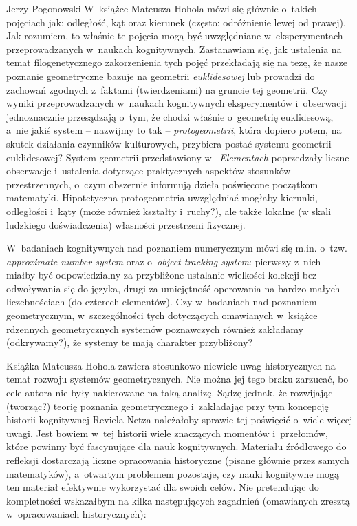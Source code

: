 \begin{newrevplenv}{Jerzy Pogonowski}
W~książce Mateusza Hohola mówi się głównie o~takich pojęciach jak:
odległość, kąt oraz kierunek (często: odróżnienie lewej od
prawej). Jak rozumiem, to właśnie te pojęcia mogą być uwzględniane
w~eksperymentach przeprowadzanych w~naukach kognitywnych.
Zastanawiam się, jak ustalenia na temat filogenetycznego
zakorzenienia tych pojęć przekładają się na tezę, że nasze
poznanie geometryczne bazuje na geometrii {\em euklidesowej} lub
prowadzi do zachowań zgodnych z~faktami (twierdzeniami) na gruncie
tej geometrii. Czy wyniki przeprowadzanych w~naukach kognitywnych
eksperymentów i~obserwacji jednoznacznie przesądzają o~tym, że
chodzi właśnie o~geometrię euklidesową, a~nie jakiś system --
nazwijmy to tak -- {\em protogeometrii}, która dopiero potem, na
skutek działania czynników kulturowych, przybiera postać systemu
geometrii euklidesowej? System geometrii przedstawiony w~{\em
Elementach} poprzedzały liczne obserwacje i~ustalenia dotyczące
praktycznych aspektów stosunków przestrzennych, o~czym obszernie
informują dzieła poświęcone początkom matematyki. Hipotetyczna
protogeometria uwzględniać mogłaby kierunki, odległości i~kąty
(może również kształty i~ruchy?), ale także lokalne (w skali
ludzkiego doświadczenia) własności przestrzeni fizycznej.

W~badaniach kognitywnych nad poznaniem numerycznym mówi się m.in.
o~tzw. {\em approximate number system} oraz o~{\em object tracking
system}: pierwszy z~nich miałby być odpowiedzialny za przybliżone
ustalanie wielkości kolekcji bez odwoływania się do języka, drugi
za umiejętność operowania na bardzo małych liczebnościach (do
czterech elementów). Czy w~badaniach nad poznaniem geometrycznym,
w~szczególności tych dotyczących omawianych w~książce rdzennych
geometrycznych systemów poznawczych również zakładamy
(odkrywamy?), że systemy te mają charakter przybliżony?

Książka Mateusza Hohola zawiera stosunkowo niewiele uwag
historycznych na temat rozwoju systemów geometrycznych. Nie można
jej tego braku zarzucać, bo cele autora nie były nakierowane na
taką analizę. Sądzę jednak, że rozwijając (tworząc?) teorię
poznania geometrycznego i~zakładając przy tym koncepcję historii
kognitywnej Reviela Netza należałoby sprawie tej poświęcić o~wiele
więcej uwagi. Jest bowiem w~tej historii wiele znaczących momentów
i~przełomów, które powinny być fascynujące dla nauk kognitywnych.
Materiału źródłowego do refleksji dostarczają liczne opracowania
historyczne (pisane głównie przez samych matematyków), a~otwartym
problemem pozostaje, czy nauki kognitywne mogą ten materiał
efektywnie wykorzystać dla swoich celów. Nie pretendując do
kompletności wskazałbym na kilka następujących zagadnień
(omawianych zresztą w~opracowaniach historycznych):


\end{newrevplenv}
